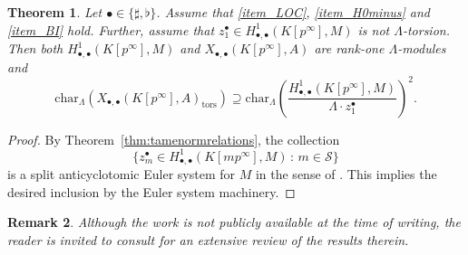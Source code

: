 \documentclass{amsart}
\numberwithin{equation}{section}
\newtheorem{theorem}{Theorem}[section]
\newtheorem{remark}[theorem]{Remark}
\newcommand{\Char}{\mathrm{char}}
\begin{document}
\begin{theorem}\label{thm:mainconjectures}
Let $\bullet\in\lbrace \sharp,\flat\rbrace$. Assume that \eqref{item_LOC}, \eqref{item_H0minus} and \eqref{item_BI} hold. Further, assume that $z_1^\bullet\in H^1_{\bullet,\bullet}(K[p^\infty],M)$ is not $\Lambda$-torsion. Then both $H^1_{\bullet,\bullet}(K[p^\infty],M)$ and $X_{\bullet,\bullet}(K[p^\infty],A)$ are rank-one $\Lambda$-modules and
\[
\Char_{\Lambda}\left(X_{\bullet,\bullet}(K[p^\infty],A)_{\mathrm{tors}}\right)\supseteq\Char_{\Lambda} \left(\frac{H^1_{\bullet,\bullet}(K[p^\infty],M)}{\Lambda \cdot z_1^\bullet} \right)^2.
\]
\end{theorem}
\begin{proof}
    By Theorem~\ref{thm:tamenormrelations}, the collection
    \[
    \lbrace z_m^{\bullet}\in H^1_{\bullet,\bullet}(K[mp^\infty],M)\,\colon\, m\in \mathcal{S} \rbrace
    \]
    is a split anticyclotomic Euler system for $M$ in the sense of \cite{JNS}.
    This implies the desired inclusion by the Euler system machinery.
\end{proof}



\begin{remark}
    Although the work \cite{JNS} is not publicly available at the time of writing, the reader is invited to consult \cite[\S8]{ACR} for an extensive review of the results therein.
\end{remark}



\end{document}
